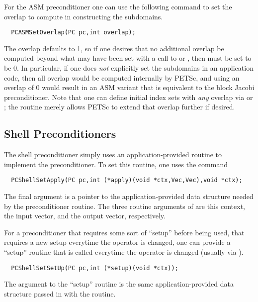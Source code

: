 For the ASM preconditioner one can use the following command to set
the overlap to compute in constructing the subdomains.
\begin{verbatim}
  PCASMSetOverlap(PC pc,int overlap);
\end{verbatim}
The overlap defaults to 1, so if one desires that no additional
overlap be computed beyond what may have been set with a call to  or , then
 must be set to be 0.  In particular, if one does {\em
not} explicitly set the subdomains in an application code, then all
overlap would be computed internally by PETSc, and using an overlap of
0 would result in an ASM variant that is equivalent to the block
Jacobi preconditioner.  Note that one can define initial index sets
 with {\em any} overlap via  or
; the routine 
merely allows PETSc to extend that overlap further if desired.

\subsection{Shell Preconditioners}

The shell preconditioner simply uses an application-provided routine to 
implement the preconditioner. To set this routine, one uses the 
command 
\begin{verbatim}
  PCShellSetApply(PC pc,int (*apply)(void *ctx,Vec,Vec),void *ctx);
\end{verbatim}
The final argument  is a pointer to the application-provided 
data structure needed by the preconditioner routine.
The three routine arguments of  are this context, the
input vector, and the output vector, respectively.

For a preconditioner that requires some sort of ``setup'' before being used,
that requires a new setup everytime the operator is changed, one can 
provide a ``setup'' routine that is called everytime the operator is 
changed (usually via ).
\begin{verbatim}
  PCShellSetSetUp(PC pc,int (*setup)(void *ctx));
\end{verbatim}
The argument to the ``setup'' routine is the same application-provided 
data structure passed in with the  routine.

